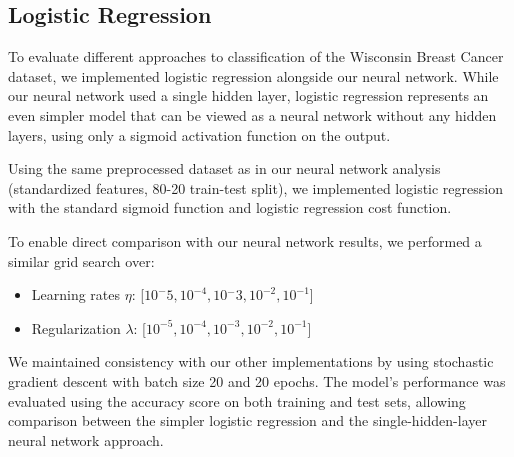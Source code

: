 \documentclass[aps,pra,english,notitlepage,reprint,nofootinbib]{revtex4-1}  %
\begin{document}
\subsection{Logistic Regression}
To evaluate different approaches to classification of the Wisconsin Breast Cancer dataset, we implemented logistic regression alongside our neural network. While our neural network used a single hidden layer, logistic regression represents an even simpler model that can be viewed as a neural network without any hidden layers, using only a sigmoid activation function on the output.

Using the same preprocessed dataset as in our neural network analysis (standardized features, 80-20 train-test split), we implemented logistic regression with the standard sigmoid function and logistic regression cost function.

To enable direct comparison with our neural network results, we performed a similar grid search over:

\begin{itemize}
    \item Learning rates \( \eta \): [\( 10^-{5,} 10^{-4}, 10{^-}3, 10^{-2}, 10^{-1} \)]
    \item Regularization \( \lambda \): [\( 10^{-5}, 10^{-4}, 10^{-3}, 10^{-2}, 10^{-1} \)]
\end{itemize}
We maintained consistency with our other implementations by using stochastic gradient descent with batch size 20 and 20 epochs. The model's performance was evaluated using the accuracy score on both training and test sets, allowing comparison between the simpler logistic regression and the single-hidden-layer neural network approach.


\end{document}
